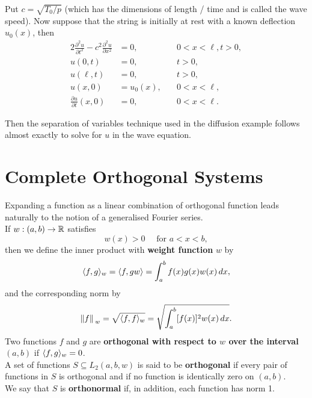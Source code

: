 Put \(c = \sqrt{T_0 / p}\) (which has the dimensions of length / time and is called the wave speed). Now suppose that the string is initially at rest with a known deflection \(u_0(x)\), then
\begin{alignat*}{2}
    \frac{\partial^2 u}{\partial t^2} - c^2 \frac{\partial^2 u }{\partial x^2} & = 0, \quad      & 0 <x < \ell, t > 0, \\
    u(0, t)                                                                    & = 0, \quad      & t> 0,               \\
    u(\ell, t)                                                                 & = 0, \quad      & t > 0,              \\
    u(x, 0)                                                                    & = u_0(x), \quad & 0 < x < \ell,       \\
    \frac{\partial u}{\partial t}(x, 0)                                        & = 0, \quad      & 0 < x < \ell.
\end{alignat*}

Then the separation of variables technique used in the diffusion example follows almost exactly to solve for \(u\) in the wave equation.

\section{Complete Orthogonal Systems}
Expanding a function as a linear combination of orthogonal function leads naturally to the notion of a generalised Fourier series. \\

If \(w : (a,b) \to \mathbb{R}\) satisfies
\[w(x) > 0 \quad \text{ for } a < x < b,\]
then we define the inner product with \textbf{weight function} \(w\) by
\[\langle f, g \rangle_w = \langle f, gw \rangle = \int_a^b f(x)g(x)w(x) \, dx,\]
and the corresponding norm by
\[\norm*{f}_w = \sqrt{\langle f, f \rangle_w} = \sqrt{\int_a^b [f(x)]^2w(x) \, dx}.\]
Two functions \(f\) and \(g\) are \textbf{orthogonal with respect to \(w\) over the interval \((a, b)\)} if \(\langle f, g \rangle_w = 0\). \\

A set of functions \(S \subseteq L_2(a, b, w)\) is said to be \textbf{orthogonal} if every pair of functions in \(S\) is orthogonal and if no function is identically zero on \((a, b)\). \\

We say that \(S\) is \textbf{orthonormal} if, in addition, each function has norm 1.

